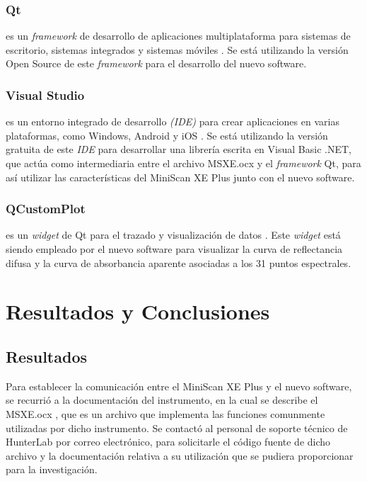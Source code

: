 \documentclass[conference]{IEEEtran}
\begin{document}
		\subsubsection{Qt}
			es un \textit{framework} de desarrollo de aplicaciones multiplataforma para sistemas de escritorio, sistemas integrados y sistemas m\'{o}viles \cite{Qt}. Se est\'{a} utilizando la versi\'{o}n Open Source de este \textit{framework} para el desarrollo del nuevo software.
			
		\subsubsection{Visual Studio}
			es un entorno integrado de desarrollo \textit{(IDE)} para crear aplicaciones en varias plataformas, como Windows, Android y iOS \cite{VS}. Se est\'{a} utilizando la versi\'{o}n gratuita de este \textit{IDE} para desarrollar una librer\'{i}a escrita en Visual Basic .NET, que act\'{u}a como intermediaria entre el archivo MSXE.ocx y el \textit{framework} Qt, para as\'{i} utilizar las caracter\'{i}sticas del MiniScan XE Plus junto con el nuevo software.

		\subsubsection{QCustomPlot}
			es un \textit{widget} de Qt para el trazado y visualizaci\'{o}n de datos \cite{QCustomPlot}. Este \textit{widget} est\'{a} siendo empleado por el nuevo software para visualizar la curva de reflectancia difusa y la curva de absorbancia aparente asociadas a los 31 puntos espectrales.

\section{Resultados y Conclusiones}
	
	\subsection{Resultados}
	
	Para establecer la comunicaci\'{o}n entre el MiniScan XE Plus y el nuevo software, se recurri\'{o} a la documentaci\'{o}n del instrumento, en la cual se describe el MSXE.ocx \cite{MiniScanXEPlus-manual}, que es un archivo que implementa las funciones comunmente utilizadas por dicho instrumento. Se contact\'{o} al personal de soporte t\'{e}cnico de HunterLab por correo electr\'{o}nico, para solicitarle el c\'{o}digo fuente de dicho archivo y la documentaci\'{o}n relativa a su utilizaci\'{o}n que se pudiera proporcionar para la investigaci\'{o}n.
	
\end{document}
